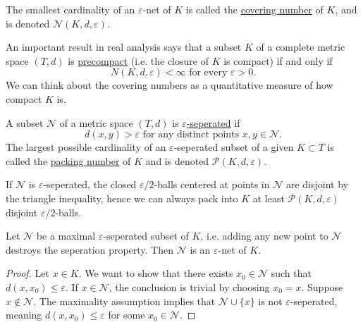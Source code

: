 \begin{definition}[]
\label{def:4.2.2}
The smallest cardinality of an $\varepsilon$-net of $K$ is called the \underline{covering number} of 
$K$, and is denoted $\mathcal{N}(K, d, \varepsilon)$.
\end{definition}

\begin{remark}[Compactness]
\label{rmk:4.2.3}
An important result in real analysis says that a subset $K$ of a complete metric space $(T, d)$ is 
\underline{precompact} (i.e. the closure of $K$ is compact) if and only if
\[ N(K, d, \varepsilon) < \infty \text{ for every } \varepsilon > 0. \]
We can think about the covering numbers as a quantitative measure of how compact $K$ is.
\end{remark}

\begin{definition}[]
\label{def:4.2.4}
A subset $\mathcal{N}$ of a metric space $(T, d)$ is \underline{$\varepsilon$-seperated} if 
\[ d(x, y) > \varepsilon \text{ for any distinct points } x, y \in \mathcal{N}. \]
The largest possible cardinality of an $\varepsilon$-seperated subset of a given $K \subset T$ is called 
the \underline{packing number} of $K$ and is denoted $\mathcal{P}(K, d, \varepsilon)$.
\end{definition}

\begin{remark}
\label{rmk:4.2.5}
If $\mathcal{N}$ is $\varepsilon$-seperated, the closed $\varepsilon / 2$-balls centered at points in 
$\mathcal{N}$ are disjoint by the triangle inequality, hence we can always pack into $K$ at least 
$\mathcal{P}(K, d, \varepsilon)$ disjoint $\varepsilon / 2$-balls.
\end{remark}

\begin{lemma}
\label{lem:4.2.6}
Let $\mathcal{N}$ be a maximal $\varepsilon$-seperated subset of $K$, i.e. adding any new point to $\mathcal{N}$ 
destroys the seperation property. Then $\mathcal{N}$ is an $\varepsilon$-net of $K$.
\end{lemma}

\begin{proof}
Let $x \in K$. We want to show that there exists $x_0 \in \mathcal{N}$ such that $d(x, x_0) \leq \varepsilon$. 
If $x \in \mathcal{N}$, the conclusion is trivial by choosing $x_0 = x$. Suppose $x \notin \mathcal{N}$. 
The maximality assumption implies that $\mathcal{N} \cup \{x\}$ is not $\varepsilon$-seperated, meaning 
$d(x, x_0) \leq \varepsilon$ for some $x_0 \in \mathcal{N}$.
\end{proof}

